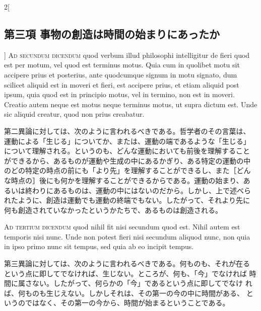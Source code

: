 \documentclass[paper=a4paper,fontsize=10pt,jafontsize=9pt,titlepage]{jlreq}
\begin{document}
\begin{paracol}{2}[\subsection{第三項 事物の創造は時間の始まりにあったか}]
{\scshape Ad secundum dicendum} quod verbum illud
philosophi intelligitur de fieri quod est per motum, vel quod est
terminus motus. Quia cum in quolibet motu sit accipere prius et
posterius, ante quodcumque signum in motu signato, dum scilicet aliquid
est in moveri et fieri, est accipere prius, et etiam aliquid post ipsum,
quia quod est in principio motus, vel in termino, non est in
moveri. Creatio autem neque est motus neque terminus motus, ut supra
dictum est. Unde sic aliquid creatur, quod non prius creabatur.


\switchcolumn


第二異論に対しては、次のように言われるべきである。哲学者のその言葉は、
運動による「生じる」についてか、または、運動の端であるような「生じる」
について理解される。というのも、どんな運動においても前後を理解すること
ができるから、あるものが運動や生成の中にあるかぎり、ある特定の運動の中
のどの特定の時点の前にも「より先」を理解することができるし、また［どん
な時点の］後にも何かを理解することができるからである。運動の始まり、あ
るいは終わりにあるものは、運動の中にはないのだから。しかし、上で述べら
れたように、創造は運動でも運動の終端でもない。したがって、それより先に
何も創造されていなかったというかたちで、あるものは創造される。


\switchcolumn*[\subsection{ad.3}]


{\scshape Ad tertium dicendum} quod nihil fit nisi
secundum quod est. Nihil autem est temporis nisi nunc. Unde non potest
fieri nisi secundum aliquod nunc, non quia in ipso primo nunc sit
tempus, sed quia ab eo incipit tempus.


\switchcolumn


第三異論に対しては、次のように言われるべきである。何ものも、それが在る
という点に即してでなければ、生じない。ところが、何も、「今」でなければ
時間に属さない。したがって、何らかの「今」であるという点に即してでなけ
れば、何ものも生じえない。しかしそれは、その第一の今の中に時間がある、
というのではなく、その第一の今から、時間が始まるということである。


\switchcolumn*



\end{paracol}
\end{document}
